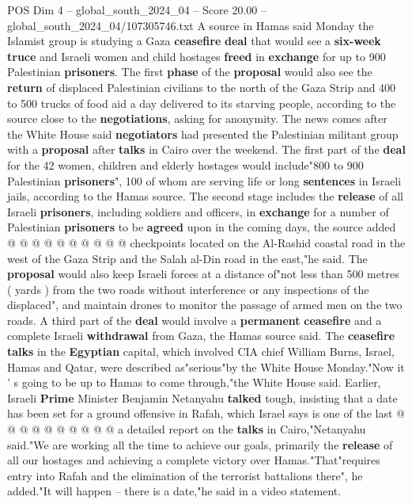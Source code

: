 \begin{textsample}{POS Dim 4 – global\_south\_2024\_04 – Score 20.00 – global\_south\_2024\_04/107305746.txt}  \label{ex:f4_pos_267}
A source in Hamas said Monday the Islamist group is studying a Gaza \textbf{ceasefire} \textbf{deal} that would see a \textbf{six-week} \textbf{truce} and Israeli women and child hostages \textbf{freed} in \textbf{exchange} for up to 900 Palestinian \textbf{prisoners}.
The first \textbf{phase} of the \textbf{proposal} would also see the \textbf{return} of displaced Palestinian civilians to the north of the Gaza Strip and 400 to 500 trucks of food aid a day delivered to its starving people, according to the source close to the \textbf{negotiations}, asking for anonymity.
The news comes after the White House said \textbf{negotiators} had presented the Palestinian militant group with a \textbf{proposal} after \textbf{talks} in Cairo over the weekend.
The first part of the \textbf{deal} for the 42 women, children and elderly hostages would include"800 to 900 Palestinian \textbf{prisoners}", 100 of whom are serving life or long \textbf{sentences} in Israeli jails, according to the Hamas source.
The second stage includes the \textbf{release} of all Israeli \textbf{prisoners}, including soldiers and officers, in \textbf{exchange} for a number of Palestinian \textbf{prisoners} to be \textbf{agreed} upon in the coming days, the source added @ @ @ @ @ @ @ @ @ @ checkpoints located on the Al-Rashid coastal road in the west of the Gaza Strip and the Salah al-Din road in the east,"he said.
The \textbf{proposal} would also keep Israeli forces at a distance of"not less than 500 metres ( yards ) from the two roads without interference or any inspections of the displaced", and maintain drones to monitor the passage of armed men on the two roads.
A third part of the \textbf{deal} would involve a \textbf{permanent} \textbf{ceasefire} and a complete Israeli \textbf{withdrawal} from Gaza, the Hamas source said.
The \textbf{ceasefire} \textbf{talks} in the \textbf{Egyptian} capital, which involved CIA chief William Burns, Israel, Hamas and Qatar, were described as"serious"by the White House Monday."Now it ' s going to be up to Hamas to come through,"the White House said.
Earlier, Israeli \textbf{Prime} Minister Benjamin Netanyahu \textbf{talked} tough, insisting that a date has been set for a ground offensive in Rafah, which Israel says is one of the last @ @ @ @ @ @ @ @ @ @ a detailed report on the \textbf{talks} in Cairo,"Netanyahu said."We are working all the time to achieve our goals, primarily the \textbf{release} of all our hostages and achieving a complete victory over Hamas."That"requires entry into Rafah and the elimination of the terrorist battalions there", he added."It will happen -- there is a date,"he said in a video statement.

\end{textsample}
